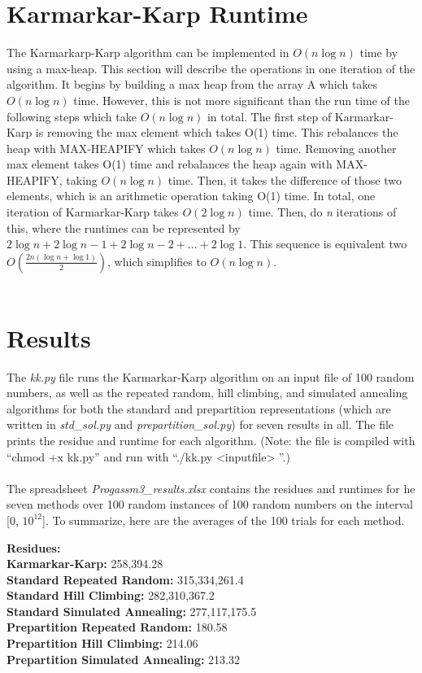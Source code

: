 \documentclass[11pt]{article}
\begin{document}
\section{\textbf{Karmarkar-Karp Runtime}}
The Karmarkarp-Karp algorithm can be implemented in $O(n\log n)$ time by using a max-heap. This section will describe the operations in one iteration of the algorithm. It begins by building a max heap from the array A which takes $O(n\log n)$ time. However, this is not more significant than the run time of the following steps which take $O(n\log n)$ in total. The first step of Karmarkar-Karp is removing the max element which takes O(1) time. This rebalances the heap with MAX-HEAPIFY which takes $O(n\log n)$ time. Removing another max element takes O(1) time and rebalances the heap again with MAX-HEAPIFY, taking $O(n\log n)$ time. Then, it takes the difference of those two elements, which is an arithmetic operation taking O(1) time. In total, one iteration of Karmarkar-Karp takes $O(2\log n)$ time. Then, do \textit{n} iterations of this, where the runtimes can be represented by $2\log n + 2\log{n -1} + 2\log{n-2} + ... + 2\log{1}$. This sequence is equivalent two $O(\frac{2n(\log{n} + \log{1})}{2})$, which simplifies to $O(n\log n)$.  \\\\

\section{\textbf{Results}}
The \textit{kk.py} file runs the Karmarkar-Karp algorithm on an input file of 100 random numbers, as well as the repeated random, hill climbing, and simulated annealing algorithms for both the standard and prepartition representations (which are written in \textit{std\_sol.py} and \textit{prepartition\_sol.py}) for seven results in all. The file prints the residue and runtime for each algorithm. (Note: the  file is compiled with “chmod +x kk.py” and run with “./kk.py <inputfile> ”.) \\\\

The spreadsheet \textit{Progassm3\_results.xlsx} contains the residues and runtimes for he seven methods over 100 random instances of 100 random numbers on the interval [0, $10^12$]. To summarize, here are the averages of the 100 trials for each method.

\indent \textbf{Residues:}\\
\indent \indent \textbf{Karmarkar-Karp:} 258,394.28\\
\indent \indent \textbf{Standard Repeated Random:} 315,334,261.4\\
\indent \indent \textbf{Standard Hill Climbing:} 282,310,367.2\\
\indent \indent \textbf{Standard Simulated Annealing:} 277,117,175.5\\
\indent \indent \textbf{Prepartition Repeated Random:} 180.58\\
\indent \indent \textbf{Prepartition Hill Climbing:} 214.06\\
\indent \indent \textbf{Prepartition Simulated Annealing:} 213.32\\\\
\end{document}
